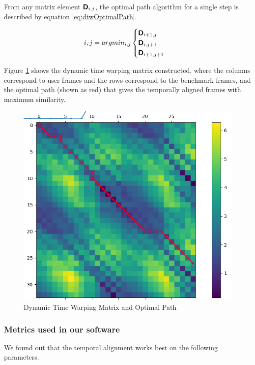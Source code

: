 From any matrix element $\boldsymbol { \mathsf{D}}_{i,j}$, the optimal path algorithm for a single step is described by equation \ref{eq:dtwOptimalPath}.

\begin{align}
  i,j = argmin_{i,j}
  \begin{cases}
    \boldsymbol { \mathsf{D}}_{i+1,j}  \\
    \boldsymbol { \mathsf{D}}_{i,j+1}  \\
    \boldsymbol { \mathsf{D}}_{i+1,j+1} \\
    \label{eq:dtwOptimalPath}
\end{cases}
\end{align}

Figure \ref{fig:dtw_matrix} shows the dynamic time warping matrix constructed, where the columns correspond to user frames and the rows correspond to the benchmark frames, and the optimal path (shown as red) that gives the temporally aligned frames with maximum similarity. 

\begin{figure}
  \centering
  \includegraphics[scale=0.8]{images/graphs/dtw_matrix.png}
  \caption{Dynamic Time Warping Matrix and Optimal Path}
  \label{fig:dtw_matrix}
\end{figure}

\subsubsection{Metrics used in our software}
We found out that the temporal alignment works best on the following parameters.

